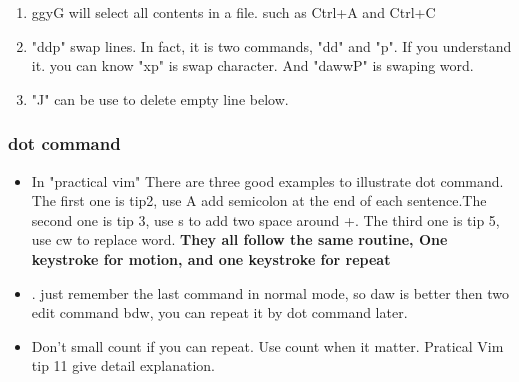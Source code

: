 \documentclass[a4paper,12pt,twoside]{book}
\begin{document}
\begin{itemize}
\begin{enumerate}
				\item ggyG will select all contents in a file. such as Ctrl+A and Ctrl+C 

			\item "ddp" swap lines. In fact, it is two commands, "dd" and "p". If you understand it. you can know "xp" is swap character. And "dawwP" is swaping word.

			\item "J" can be use to delete empty line below.
	\end{enumerate}
\end{itemize}

\subsubsection{dot command}
\begin{itemize}
		\begin{enumerate}
				\item insertion : a, A, i, I, o, O
				\item Text changes involving registers: c, C, d, D, p, gp, P, gP, s, S,x, X
				\item Other text changes: J, gJ, r, gr, R, gR, gU, gu, gw, gq, g?, ~, g~, <, >, =
				\item Equivalent of these operations in visual mode.
				\item Control-operations: C-A, C-X
				\item gi will repeat the insertion but at current cursor position, not at last insert position. So it sort of works.
		\end{enumerate}
\item In "practical vim" There are three good examples to illustrate dot command. The first one is tip2, use A add semicolon at the end of each sentence.The second one is tip 3, use s to add two space around +. The third one is tip 5, use cw to replace word. \textbf{They all follow the same routine, One keystroke for motion, and one keystroke for repeat}

\item . just remember the last command in normal mode, so daw is better then two edit command bdw, you can repeat it by dot command later.

\item  Don't small count if you can repeat. Use count when it matter. Pratical Vim tip 11 give detail explanation. 
\end{itemize}
\end{document}
